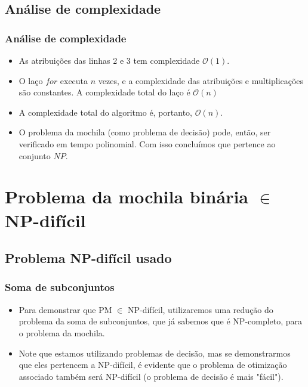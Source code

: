 \documentclass{beamer}
\begin{document}
\subsection{Análise de complexidade}
\begin{frame}
    \frametitle{Análise de complexidade}

    \begin{itemize}
        \item As atribuições das linhas 2 e 3 tem complexidade $\mathcal{O}(1)$.

        \item O laço $for$ executa $n$ vezes, e a complexidade das atribuições e multiplicações são constantes.
            A complexidade total do laço é $\mathcal{O}(n)$

        \item A complexidade total do algoritmo é, portanto, $\mathcal{O}(n)$.
        \item O problema da mochila (como problema de decisão) pode, então, ser verificado em tempo polinomial.
              Com isso concluímos que pertence ao conjunto $NP$.
    \end{itemize}

\end{frame}


\section{Problema da mochila binária $\in$ NP-difícil}

\subsection{Problema NP-difícil usado}
\begin{frame}
    \frametitle{Soma de subconjuntos}
    \begin{itemize}
        \item
            Para demonstrar que PM $\in$ NP-difícil, utilizaremos uma redução do problema
            da soma de subconjuntos, que já sabemos que é NP-completo, para o problema da mochila.
        \item
            Note que estamos utilizando problemas de decisão, mas se demonstrarmos que
            eles pertencem a NP-difícil, é evidente que o problema de otimização associado
            também será NP-difícil (o problema de decisão é mais "fácil").
    \end{itemize}

\end{frame}
\end{document}
